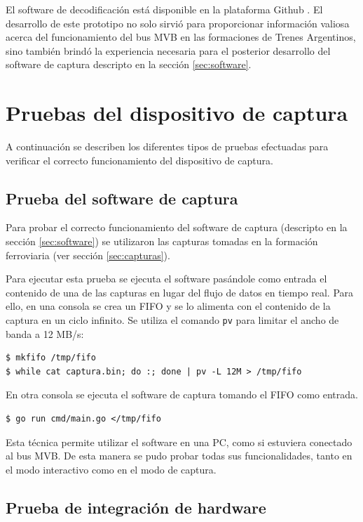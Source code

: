El software de decodificación está disponible en la plataforma Github \cite{mvbparse-py}. El desarrollo de este prototipo no solo sirvió para proporcionar información valiosa acerca del funcionamiento del bus MVB en las formaciones de Trenes Argentinos, sino también brindó la experiencia necesaria para el posterior desarrollo del software de captura descripto en la sección \ref{sec:software}.

\section{Pruebas del dispositivo de captura}

A continuación se describen los diferentes tipos de pruebas efectuadas para verificar el correcto funcionamiento del dispositivo de captura.

\subsection{Prueba del software de captura}

Para probar el correcto funcionamiento del software de captura (descripto en la sección \ref{sec:software}) se utilizaron las capturas tomadas en la formación ferroviaria (ver sección \ref{sec:capturas}).

Para ejecutar esta prueba se ejecuta el software pasándole como entrada el contenido de una de las capturas en lugar del flujo de datos en tiempo real. Para ello, en una consola se crea un FIFO y se lo alimenta con el contenido de la captura en un ciclo infinito. Se utiliza el comando \texttt{pv} \cite{pv} para limitar el ancho de banda a 12 MB/s:

\begin{lstlisting}
$ mkfifo /tmp/fifo
$ while cat captura.bin; do :; done | pv -L 12M > /tmp/fifo
\end{lstlisting}

En otra consola se ejecuta el software de captura tomando el FIFO como entrada.

\begin{lstlisting}
$ go run cmd/main.go </tmp/fifo
\end{lstlisting}

Esta técnica permite utilizar el software en una PC, como si estuviera conectado al bus MVB.
De esta manera se pudo probar todas sus funcionalidades, tanto en el modo interactivo como en el modo de captura.

\subsection{Prueba de integración de hardware}

